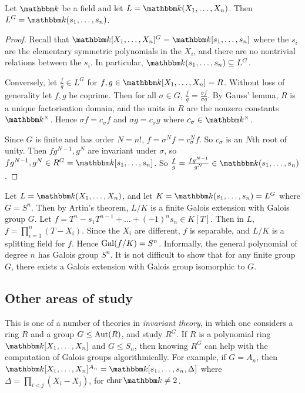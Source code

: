 \begin{theorem}
	Let \( \mathbbm k \) be a field and let \( L = \mathbbm k(X_1, \dots, X_n) \).
	Then \( L^G = \mathbbm k(s_1, \dots, s_n) \).
\end{theorem}
\begin{proof}
	Recall that \( \mathbbm k[X_1, \dots, X_n]^G = \mathbbm k[s_1, \dots, s_n] \) where the \( s_i \) are the elementary symmetric polynomials in the \( X_i \), and there are no nontrivial relations between the \( s_i \).
	In particular, \( \mathbbm k(s_1, \dots, s_n) \subseteq L^G \).

	Conversely, let \( \frac{f}{g} \in L^G \) for \( f, g \in \mathbbm k[X_1, \dots, X_n] = R \).
	Without loss of generality let \( f, g \) be coprime.
	Then for all \( \sigma \in G \), \( \frac{f}{g} = \frac{\sigma f}{\sigma g} \).
	By Gauss' lemma, \( R \) is a unique factorisation domain, and the units in \( R \) are the nonzero constants \( \mathbbm k^\times \).
	Hence \( \sigma f = c_\sigma f \) and \( \sigma g = c_\sigma g \) where \( c_\sigma \in \mathbbm k^\times \).

	Since \( G \) is finite and has order \( N = n! \), \( f = \sigma^N f = c_\sigma^N f \).
	So \( c_\sigma \) is an \( N \)th root of unity.
	Then \( fg^{N-1}, g^N \) are invariant under \( \sigma \), so \( fg^{N-1}, g^N \in R^G = \mathbbm k[s_1, \dots, s_n] \).
	So \( \frac{f}{g} = \frac{fg^{N-1}}{g^N} \in \mathbbm k(s_1, \dots, s_n) \).
\end{proof}
\begin{example}
	Let \( L = \mathbbm k(X_1, \dots, X_n) \), and let \( K = \mathbbm k(s_1, \dots, s_n) = L^G \) where \( G = S^n \).
	Then by Artin's theorem, \( L/K \) is a finite Galois extension with Galois group \( G \).
	Let \( f = T^n - s_1 T^{n-1} + \dots + (-1)^n s_n \in K[T] \).
	Then in \( L \), \( f = \prod_{i=1}^n (T - X_i) \).
	Since the \( X_i \) are different, \( f \) is separable, and \( L / K \) is a splitting field for \( f \).
	Hence \( \operatorname{Gal}(f/K) = S^n \).
	Informally, the general polynomial of degree \( n \) has Galois group \( S^n \).
	It is not difficult to show that for any finite group \( G \), there exists a Galois extension with Galois group isomorphic to \( G \).
\end{example}

\subsection{Other areas of study}
This is one of a number of theories in \emph{invariant theory}, in which one considers a ring \( R \) and a group \( G \leq \operatorname{Aut}(R) \), and study \( R^G \).
If \( R \) is a polynomial ring \( \mathbbm k[X_1, \dots, X_n] \) and \( G \leq S_n \), then knowing \( R^G \) can help with the computation of Galois groups algorithmically.
For example, if \( G = A_n \), then \( \mathbbm k[X_1, \dots, X_n]^{A_n} = \mathbbm k[s_1, \dots, s_n, \Delta] \) where \( \Delta = \prod_{i < j} (X_i - X_j) \), for \( \fchar \mathbbm k \neq 2 \).

